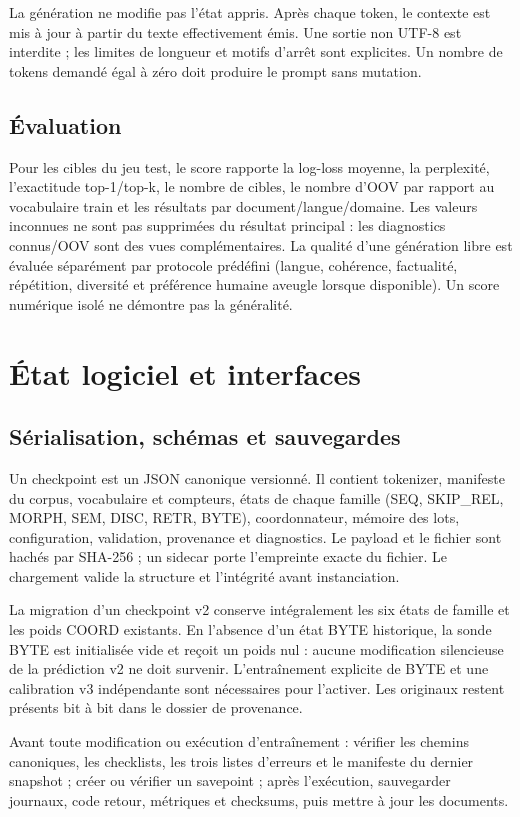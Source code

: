\documentclass[11pt,a4paper,oneside,openany]{book}
\begin{document}
La génération ne modifie pas l'état appris. Après chaque token, le contexte est mis à jour à partir du texte effectivement émis. Une sortie non UTF-8 est interdite ; les limites de longueur et motifs d'arrêt sont explicites. Un nombre de tokens demandé égal à zéro doit produire le prompt sans mutation.

\chapter{Évaluation}
Pour les cibles du jeu test, le score rapporte la log-loss moyenne, la perplexité, l'exactitude top-1/top-k, le nombre de cibles, le nombre d'OOV par rapport au vocabulaire train et les résultats par document/langue/domaine. Les valeurs inconnues ne sont pas supprimées du résultat principal : les diagnostics connus/OOV sont des vues complémentaires. La qualité d'une génération libre est évaluée séparément par protocole prédéfini (langue, cohérence, factualité, répétition, diversité et préférence humaine aveugle lorsque disponible). Un score numérique isolé ne démontre pas la généralité.

\part{État logiciel et interfaces}
\chapter{Sérialisation, schémas et sauvegardes}
Un checkpoint est un JSON canonique versionné. Il contient tokenizer, manifeste du corpus, vocabulaire et compteurs, états de chaque famille (SEQ, SKIP_REL, MORPH, SEM, DISC, RETR, BYTE), coordonnateur, mémoire des lots, configuration, validation, provenance et diagnostics. Le payload et le fichier sont hachés par SHA-256 ; un sidecar porte l'empreinte exacte du fichier. Le chargement valide la structure et l'intégrité avant instanciation.

La migration d'un checkpoint v2 conserve intégralement les six états de famille et les poids COORD existants. En l'absence d'un état BYTE historique, la sonde BYTE est initialisée vide et reçoit un poids nul : aucune modification silencieuse de la prédiction v2 ne doit survenir. L'entraînement explicite de BYTE et une calibration v3 indépendante sont nécessaires pour l'activer. Les originaux restent présents bit à bit dans le dossier de provenance.

Avant toute modification ou exécution d'entraînement : vérifier les chemins canoniques, les checklists, les trois listes d'erreurs et le manifeste du dernier snapshot ; créer ou vérifier un savepoint ; après l'exécution, sauvegarder journaux, code retour, métriques et checksums, puis mettre à jour les documents.
\end{document}
